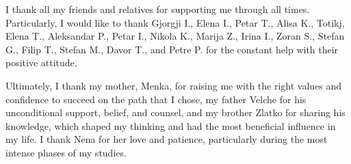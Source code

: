 \bigskip

I thank all my friends and relatives for supporting me through all times. Particularly, I would like to thank Gjorgji I., Elena I., Petar T., Alisa K., Totikj, Elena T., Aleksandar P., Petar I., Nikola K., Marija Z., Irina I., Zoran S., Stefan G., Filip T., Stefan M., Davor T., and Petre P. for the constant help with their positive attitude.   

\bigskip

Ultimately, I thank my mother, Menka, for raising me with the right values and confidence to succeed on the path that I chose, my father Velche for his unconditional support, belief, and counsel, and my brother Zlatko for sharing his knowledge, which shaped my thinking and had the most beneficial influence in my life. I thank Nena for her love and patience, particularly during the most intense phases of my studies.

\endgroup